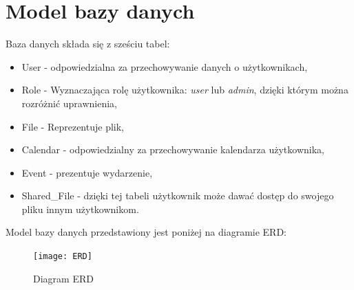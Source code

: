 \section{Model bazy danych}
\label{sec:bd}
Baza danych składa się z sześciu tabel:
\begin{itemize}
	\item User - odpowiedzialna za przechowywanie danych o użytkownikach,
	\item Role - Wyznaczająca rolę użytkownika: \textit{user} lub \textit{admin}, dzięki którym można rozróżnić uprawnienia,
	\item File - Reprezentuje plik,
	\item Calendar - odpowiedzialny za przechowywanie kalendarza użytkownika,
	\item Event - prezentuje wydarzenie,
	\item Shared\_File - dzięki tej tabeli użytkownik może dawać dostęp do swojego pliku innym użytkownikom.
\end{itemize}
\newpage
Model bazy danych przedstawiony jest poniżej na diagramie ERD:
\begin{figure}[H]
\centering
\texttt{[image: ERD]}
\caption{\label{fig:diag_02}Diagram ERD}
\end{figure}
\newpage
